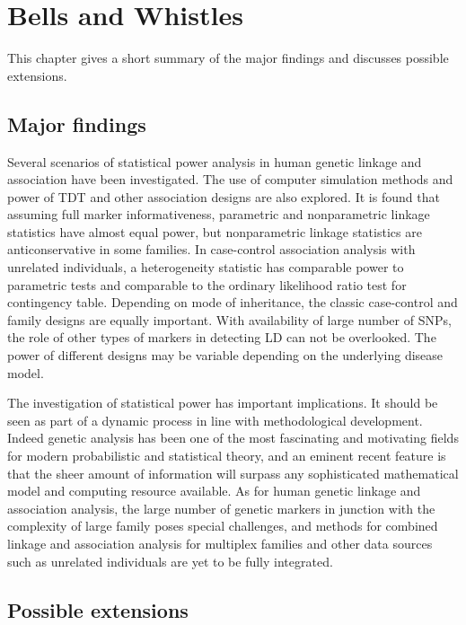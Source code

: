 
\chapter{Bells and Whistles}

This chapter gives a short summary of the major findings and discusses possible
extensions.

\section{Major findings}

Several scenarios of statistical power analysis in human genetic linkage and
association have been investigated.  The use of computer simulation methods and
power of TDT and other association designs are also explored.  It is found that
assuming full marker informativeness, parametric and nonparametric linkage
statistics have almost equal power, but nonparametric linkage statistics are
anticonservative in some families.  In case-control association analysis with
unrelated individuals, a heterogeneity statistic has comparable power to
parametric tests and comparable to the ordinary likelihood ratio test for
contingency table.  Depending on mode of inheritance, the classic case-control
and family designs are equally important.  With availability of large number of
SNPs, the role of other types of markers in detecting LD can not be overlooked.
The power of different designs may be variable depending on the underlying
disease model.

The investigation of statistical power has important implications.  It should
be seen as part of a dynamic process in line with methodological development.
Indeed genetic analysis has been one of the most fascinating and motivating
fields for modern probabilistic and statistical theory, and an eminent recent
feature is that the sheer amount of information will surpass any sophisticated
mathematical model and computing resource available.  As for human genetic
linkage and association analysis, the large number of genetic markers in
junction with the complexity of large family poses special challenges, and
methods for combined linkage and association analysis for multiplex families
and other data sources such as unrelated individuals are yet to be fully
integrated.


\section{Possible extensions}

